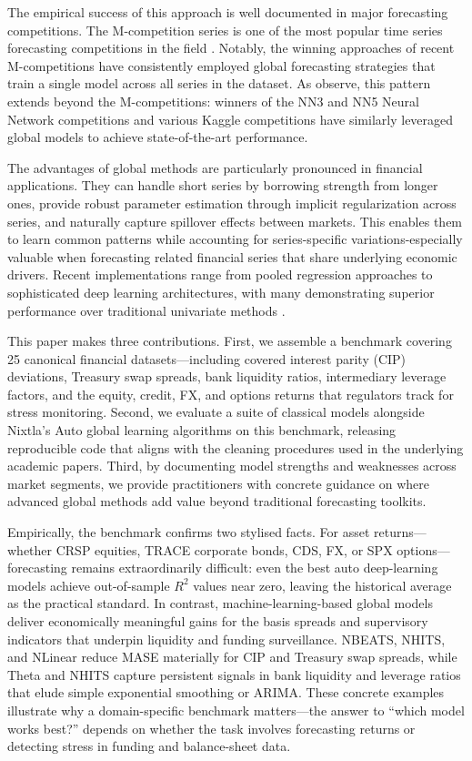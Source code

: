 \documentclass{article}
\begin{document}
The empirical success of this approach is well documented in major forecasting competitions. The M-competition series is one of the most popular time series forecasting competitions in the field \citep{Makridakis1982, Makridakis2000, Makridakis2018, Makridakis2022}. Notably, the winning approaches of recent M-competitions have consistently employed global forecasting strategies that train a single model across all series in the dataset. As \citet{Godahewa2021} observe, this pattern extends beyond the M-competitions: winners of the NN3 and NN5 Neural Network competitions and various Kaggle competitions have similarly leveraged global models to achieve state-of-the-art performance.

The advantages of global methods are particularly pronounced in financial applications. They can handle short series by borrowing strength from longer ones, provide robust parameter estimation through implicit regularization across series, and naturally capture spillover effects between markets. This enables them to learn common patterns while accounting for series-specific variations-especially valuable when forecasting related financial series that share underlying economic drivers. Recent implementations range from pooled regression approaches to sophisticated deep learning architectures, with many demonstrating superior performance over traditional univariate methods \citep{Godahewa2021}.

This paper makes three contributions. First, we assemble a benchmark covering 25 canonical financial datasets—including covered interest parity (CIP) deviations, Treasury swap spreads, bank liquidity ratios, intermediary leverage factors, and the equity, credit, FX, and options returns that regulators track for stress monitoring. Second, we evaluate a suite of classical models alongside Nixtla's Auto global learning algorithms on this benchmark, releasing reproducible code that aligns with the cleaning procedures used in the underlying academic papers. Third, by documenting model strengths and weaknesses across market segments, we provide practitioners with concrete guidance on where advanced global methods add value beyond traditional forecasting toolkits.

Empirically, the benchmark confirms two stylised facts. For asset returns—whether CRSP equities, TRACE corporate bonds, CDS, FX, or SPX options—forecasting remains extraordinarily difficult: even the best auto deep-learning models achieve out-of-sample $R^2$ values near zero, leaving the historical average as the practical standard. In contrast, machine-learning-based global models deliver economically meaningful gains for the basis spreads and supervisory indicators that underpin liquidity and funding surveillance. NBEATS, NHITS, and NLinear reduce MASE materially for CIP and Treasury swap spreads, while Theta and NHITS capture persistent signals in bank liquidity and leverage ratios that elude simple exponential smoothing or ARIMA. These concrete examples illustrate why a domain-specific benchmark matters—the answer to “which model works best?” depends on whether the task involves forecasting returns or detecting stress in funding and balance-sheet data.
\end{document}
